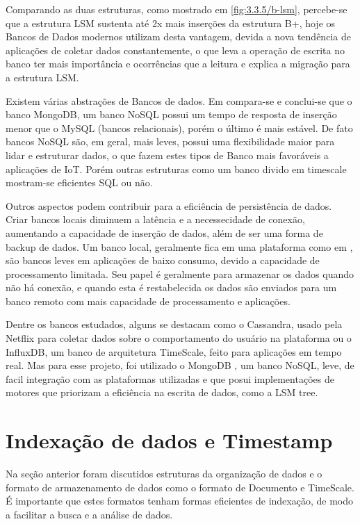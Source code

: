 Comparando as duas estruturas, como mostrado em \ref{fig:3.3.5/b-lsm}, percebe-se que a estrutura LSM sustenta até 2x mais inserções da estrutura B+, hoje os Bancos de Dados modernos utilizam desta vantagem, devida a nova tendência de aplicações de coletar dados constantemente, o que leva a operação de escrita no banco ter mais importância e ocorrências que a leitura e explica a migração para a estrutura LSM.

Existem várias abstrações de Bancos de dados. Em \cite{Rautmare-Bhalerao} compara-se e conclui-se que o banco MongoDB, um banco NoSQL possui um tempo de resposta de inserção menor que o MySQL (bancos relacionais), porém o último é mais estável. De fato bancos NoSQL são, em geral, mais leves, possui uma flexibilidade maior para lidar e estruturar dados, o que fazem estes tipos de Banco mais favoráveis a aplicações de IoT. Porém outras estruturas como um banco divido em timescale mostram-se eficientes SQL ou não.

Outros aspectos podem contribuir para a eficiência de persistência de dados. Criar bancos locais diminuem a latência e a necessecidade de conexão, aumentando a capacidade de inserção de dados, além de ser uma forma de backup de dados. Um banco local, geralmente fica em uma plataforma como em \cite{Paethong-Sato-Namiki}, são bancos leves em aplicações de baixo consumo, devido a capacidade de processamento limitada. Seu papel é geralmente para armazenar os dados quando não há conexão, e quando esta é restabelecida os dados são enviados para um banco remoto com mais capacidade de processamento e aplicações. %

Dentre os bancos estudados, alguns se destacam como o Cassandra, usado pela Netflix para coletar dados sobre o comportamento do usuário na plataforma ou o InfluxDB, um banco de arquitetura TimeScale, feito para aplicações em tempo real. Mas para esse projeto, foi utilizado o MongoDB \cite{mongodb}, um banco NoSQL, leve, de facil integração com as plataformas utilizadas e que posui implementações de motores que priorizam a eficiência na escrita de dados, como a LSM tree.

\section{Indexação de dados e Timestamp}
\label{section:timestamp}

Na seção anterior foram discutidos estruturas da organização de dados e o formato de armazenamento de dados como o formato de Documento e TimeScale. É importante que estes formatos tenham formas eficientes de indexação, de modo a facilitar a busca e a análise de dados.

